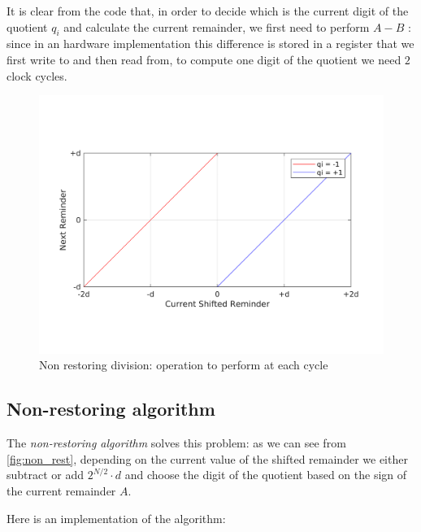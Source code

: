 It is clear from the code that, in order to decide which is the current digit of the quotient $q_i$ and calculate the current remainder, we first need to perform $A - B$ : since in an hardware implementation this difference is stored in a register that we first write to and then read from, to compute one digit of the quotient we need $2$ clock cycles.

\begin{figure}
    \centering
    \includegraphics[width=150mm]{images/non_rest.png}
    \caption{Non restoring division: operation to perform at each cycle}
    \label{fig:non_rest}
\end{figure}

\subsection{Non-restoring algorithm}
The \textit{non-restoring algorithm} solves this problem: as we can see from \autoref{fig:non_rest}, depending on the current value of the shifted remainder we either subtract or add $2^{N/2} \cdot d$  and choose the digit of the quotient based on the sign of the current remainder $A$.

Here is an implementation of the algorithm: 

